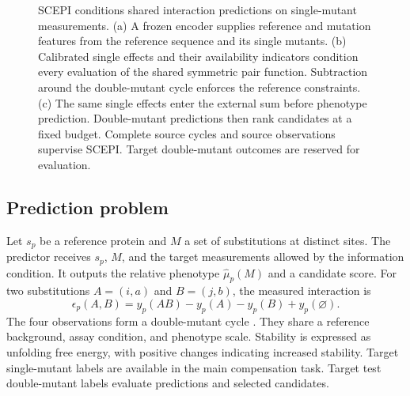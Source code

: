 \documentclass{llncs}
\begin{document}
\begin{figure}[!b]
\caption{SCEPI conditions shared interaction predictions on single-mutant measurements. (a) A frozen encoder supplies reference and mutation features from the reference sequence and its single mutants. (b) Calibrated single effects and their availability indicators condition every evaluation of the shared symmetric pair function. Subtraction around the double-mutant cycle enforces the reference constraints. (c) The same single effects enter the external sum before phenotype prediction. Double-mutant predictions then rank candidates at a fixed budget. Complete source cycles and source observations supervise SCEPI. Target double-mutant outcomes are reserved for evaluation.}
\label{fig:method}
\end{figure}

\subsection{Prediction problem}

Let $s_p$ be a reference protein and $M$ a set of substitutions at distinct sites. The predictor receives $s_p$, $M$, and the target measurements allowed by the information condition. It outputs the relative phenotype $\widehat\mu_p(M)$ and a candidate score. For two substitutions $A=(i,a)$ and $B=(j,b)$, the measured interaction is
\begin{equation}
\epsilon_p(A,B)=y_p(AB)-y_p(A)-y_p(B)+y_p(\varnothing).
\label{eq:observed}
\end{equation}
The four observations form a double-mutant cycle \citep{horovitz1996}. They share a reference background, assay condition, and phenotype scale. Stability is expressed as unfolding free energy, with positive changes indicating increased stability. Target single-mutant labels are available in the main compensation task. Target test double-mutant labels evaluate predictions and selected candidates.
\end{document}
